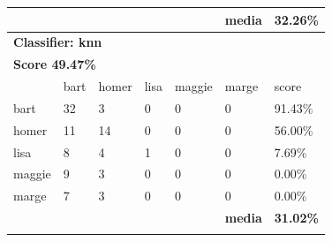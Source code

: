 \documentclass[paper=a4, fontsize=11pt]{scrartcl} %
\numberwithin{equation}{section} %
\numberwithin{figure}{section} %
\numberwithin{table}{section} %
\begin{document}
\begin{table}[!htb]
\begin{tabular}{l|l|l|l|l|l|l}
          &           &           &           &           & \textbf{media} & \textbf{32.26\%} \\ \hline
\multicolumn{7}{l}{\textbf{Classifier: knn}}                                                \\ \hline
\multicolumn{7}{l}{\textbf{Score 49.47\%}}                                                  \\ \hline
          & bart      & homer     & lisa      & maggie    & marge          & score            \\ \hline
bart      & 32        & 3         & 0         & 0         & 0              & 91.43\%          \\ \hline
homer     & 11        & 14        & 0         & 0         & 0              & 56.00\%          \\ \hline
lisa      & 8         & 4         & 1         & 0         & 0              & 7.69\%           \\ \hline
maggie    & 9         & 3         & 0         & 0         & 0              & 0.00\%           \\ \hline
marge     & 7         & 3         & 0         & 0         & 0              & 0.00\%           \\ \hline
          &           &           &           &           & \textbf{media} & \textbf{31.02\%} \\ \hline
\multicolumn{7}{l}{\multirow{2}{*}{}}                                                       \\
\end{tabular}
\end{table}
\end{document}
